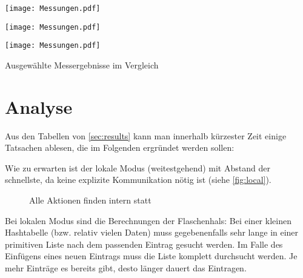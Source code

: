 \documentclass{scrreprt}
\begin{document}
\begin{table}[!ht]
\centering
\texttt{[image: Messungen.pdf]}
\caption{Messergebnisse im Modus \lstinline|distributed| mit 32 Maschinen}
\label{tab:dist32}
\end{table}

\begin{table}[!ht]
\centering
\texttt{[image: Messungen.pdf]}
\caption{Messergebnisse im Modus \lstinline|distributed| mit 42 Maschinen}
\label{tab:dist42}
\end{table}

\begin{table}[!ht]
\centering
\texttt{[image: Messungen.pdf]}
\caption{Ausgewählte Messergebnisse im Vergleich}
\label{tab:graphs}
\end{table}

\clearpage

\section{Analyse}

Aus den Tabellen von \autoref{sec:results} kann man innerhalb kürzester Zeit einige Tatsachen ablesen, die im Folgenden ergründet werden sollen:\bigskip

Wie zu erwarten ist der lokale Modus (weitestgehend) mit Abstand der schnellste, da keine explizite Kommunikation nötig ist (siehe \autoref{fig:local}). %
\begin{figure}[!ht]
\centering
{}
\caption{Alle Aktionen finden intern statt}
\label{fig:local}
\end{figure}%
Bei lokalen Modus sind die Berechnungen der Flaschenhals: Bei einer kleinen Hashtabelle (bzw. relativ vielen Daten) muss gegebenenfalls sehr lange in einer primitiven Liste nach dem passenden Eintrag gesucht werden. Im Falle des Einfügens eines neuen Eintrags muss die Liste komplett durchsucht werden. Je mehr Einträge es bereits gibt, desto länger dauert das Eintragen. \bigskip
\end{document}
